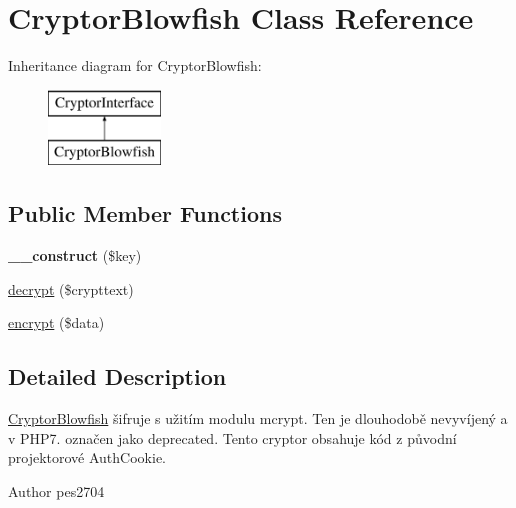 \hypertarget{class_pes_1_1_security_1_1_cryptor_1_1_cryptor_blowfish}{}\section{Cryptor\+Blowfish Class Reference}
\label{class_pes_1_1_security_1_1_cryptor_1_1_cryptor_blowfish}
Inheritance diagram for Cryptor\+Blowfish\+:\begin{figure}[H]
\begin{center}
\leavevmode
\includegraphics[height=2.000000cm]{class_pes_1_1_security_1_1_cryptor_1_1_cryptor_blowfish}
\end{center}
\end{figure}
\subsection*{Public Member Functions}
\begin{DoxyCompactItemize}
\item 
\mbox{\label{class_pes_1_1_security_1_1_cryptor_1_1_cryptor_blowfish_ae68e3281fdc4689e22a68b4b463c5fa9}} 
{\bfseries \+\_\+\+\_\+construct} (\$key)
\item 
\mbox{\hyperlink{class_pes_1_1_security_1_1_cryptor_1_1_cryptor_blowfish_a23f471892a96b88b27bcc1cd6100c79b}{decrypt}} (\$crypttext)
\item 
\mbox{\hyperlink{class_pes_1_1_security_1_1_cryptor_1_1_cryptor_blowfish_a07bcc8ef1d23370470ecb5ae8fc07dfa}{encrypt}} (\$data)
\end{DoxyCompactItemize}


\subsection{Detailed Description}
\mbox{\hyperlink{class_pes_1_1_security_1_1_cryptor_1_1_cryptor_blowfish}{Cryptor\+Blowfish}} šifruje s užitím modulu mcrypt. Ten je dlouhodobě nevyvíjený a v P\+H\+P7. označen jako deprecated. Tento cryptor obsahuje kód z původní projektorové Auth\+Cookie.

\begin{DoxyAuthor}{Author}
pes2704 
\end{DoxyAuthor}


